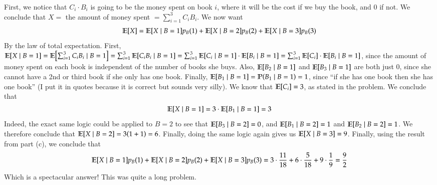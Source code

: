 \documentclass[12pt]{article}
\theoremstyle{definitionstyle}
\renewcommand{\P}{\mathbb{P}\qty}
\newcommand{\E}{\mathbb{E}\qty}
\begin{document}
\begin{enumerate}[leftmargin=\labelsep]
\begin{enumerate}
			First, we notice that $C_i \cdot B_i$ is going to be the money spent on book $i$, where it will be the cost if we buy the book, and 0 if not. We conclude that $X = $ the amount of money spent $= \sum_{i=1}^3 C_iB_i$. We now want 
			\begin{align*}
				\E[X] = \E[X \mid B = 1]p_B(1) + \E[X \mid B = 2]p_B(2) + \E[X \mid B = 3]p_B(3)
			\end{align*}
			By the law of total expectation. First, $\E[X \mid B = 1] = \E[\sum_{i=1}^3 C_iB_i \mid B = 1] = \sum_{i=1}^3 \E[C_iB_i \mid B = 1] = \sum_{i=1}^3 \E[C_i \mid B = 1] \cdot \E[B_i \mid B = 1] = \sum_{i=1}^3 \E[C_i] \cdot \E[B_i \mid B = 1]$, since the amount of money spent on each book is independent of the number of books she buys. Also, $\E[B_2 \mid B = 1]$ and $\E[B_3 \mid B = 1]$ are both just 0, since she cannot have a 2nd or third book if she only has one book. Finally, $\E[B_1 \mid B = 1] = \P(B_1 \mid B = 1) = 1$, since ``if she has one book then she has one book'' (I put it in quotes because it is correct but sounds very silly). We know that $\E[C_i] = 3$, as stated in the problem. We conclude that
			\begin{align*}
				\E[X \mid B = 1] = 3 \cdot \E[B_1 \mid B = 1] = 3
			\end{align*}
			Indeed, the exact same logic could be applied to $B = 2$ to see that $\E[B_3 \mid B = 2] = 0$, and $\E[B_1 \mid B = 2] = 1$ and $\E[B_2 \mid B = 2] = 1$. We therefore conclude that $\E[X \mid B = 2] = 3 \qty(1 + 1) = 6$. Finally, doing the same logic again gives us $\E[X \mid B = 3] = 9$. Finally, using the result from part (c), we conclude that
			\begin{align*}
				\E[X \mid B = 1]p_B(1) + \E[X \mid B = 2]p_B(2) + \E[X \mid B = 3]p_B(3) = 3 \cdot \frac{11}{18} + 6 \cdot \frac{5}{18} + 9 \cdot \frac{1}{9} = \frac{9}{2}
			\end{align*}
			Which is a spectacular answer! This was quite a long problem.
		\end{enumerate}
	

\end{enumerate}
\end{document}
